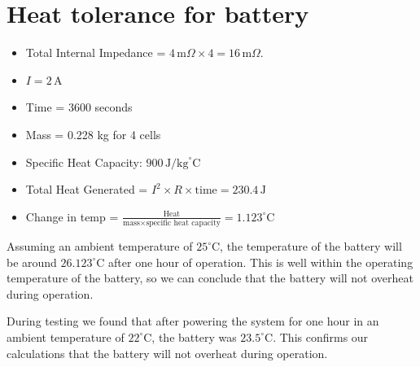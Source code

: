 \section*{Heat tolerance for battery}
\begin{itemize}
    \item Total Internal Impedance = $4\, \text{m}\Omega \times 4 = 16\, \text{m}\Omega$.
    \item $I = 2\, \text{A}$
    \item Time = 3600 seconds
    \item Mass = 0.228 kg for 4 cells
    \item Specific Heat Capacity: $900\, \text{J/kg}^\circ \text{C}$
    \item Total Heat Generated = $I^2 \times R \times \text{time} = 230.4\, \text{J}$
    \item Change in temp = $\frac{\text{Heat}}{\text{mass} \times \text{specific heat capacity}} = 1.123^\circ \text{C}$

\end{itemize}
Assuming an ambient temperature of $25^\circ \text{C}$, the temperature of the battery will be around $26.123^\circ \text{C}$ after one hour of operation. This is well within the operating temperature of the battery, so we can conclude that the battery will not overheat during operation. 

During testing we found that after powering the system for one hour in an ambient temperature of $22^\circ \text{C}$, the battery was $23.5^\circ \text{C}$. This confirms our calculations that the battery will not overheat during operation.
